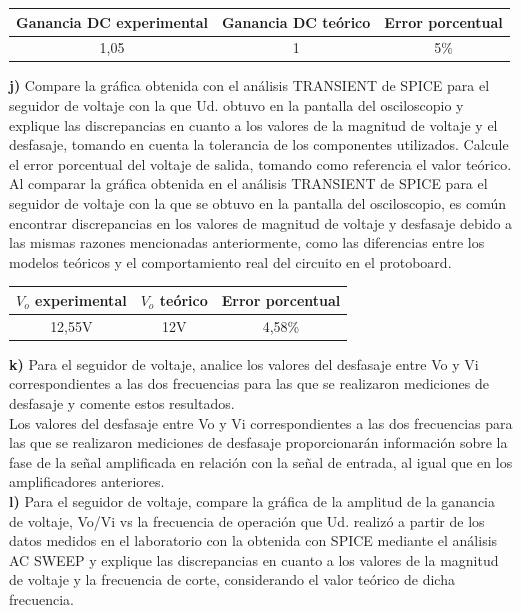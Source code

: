 \documentclass[12pt]{article}
\begin{document}
	\begin{center}
		\begin{tabular}{|c|c|c|}
			\hline
			Ganancia DC experimental & Ganancia DC teórico & Error porcentual \\
			\hline
			1,05 & 1 & 5\% \\
			\hline
		\end{tabular}
	\end{center}
	
	\noindent \textbf{j)} Compare la gráfica obtenida con el análisis TRANSIENT de SPICE para el seguidor de voltaje con la que Ud. obtuvo en la pantalla del osciloscopio y explique las discrepancias en cuanto a los valores de la magnitud de voltaje y el desfasaje, tomando	en cuenta la tolerancia de los componentes utilizados. Calcule el error porcentual del	voltaje de salida, tomando como referencia el valor teórico.\\
	
	Al comparar la gráfica obtenida en el análisis TRANSIENT de SPICE para el seguidor de voltaje con la que se obtuvo en la pantalla del osciloscopio, es común encontrar discrepancias en los valores de magnitud de voltaje y desfasaje debido a las mismas razones mencionadas anteriormente, como las diferencias entre los modelos teóricos y el comportamiento real del circuito en el protoboard.\\
	
	\begin{center}
		\begin{tabular}{|c|c|c|}
			\hline
			$V_{o}$ experimental & $V_{o}$ teórico & Error porcentual \\
			\hline
			12,55V & 12V & 4,58\% \\
			\hline
		\end{tabular}
	\end{center}
	
	\noindent \textbf{k)} Para el seguidor de voltaje, analice los valores del desfasaje entre Vo y Vi	correspondientes a las dos frecuencias para las que se realizaron mediciones de desfasaje y comente estos resultados.\\
	
	Los valores del desfasaje entre Vo y Vi correspondientes a las dos frecuencias para las que se realizaron mediciones de desfasaje proporcionarán información sobre la fase de la señal amplificada en relación con la señal de entrada, al igual que en los amplificadores anteriores.\\
	
	\noindent \textbf{l)} Para el seguidor de voltaje, compare la gráfica de la amplitud de la ganancia de voltaje,	Vo/Vi vs la frecuencia de operación que Ud. realizó a partir de los datos medidos en el laboratorio con la obtenida con SPICE mediante el análisis AC SWEEP y explique las discrepancias en cuanto a los valores de la magnitud de voltaje y la frecuencia de corte, considerando el valor teórico de dicha frecuencia.\\
	
\end{document}
